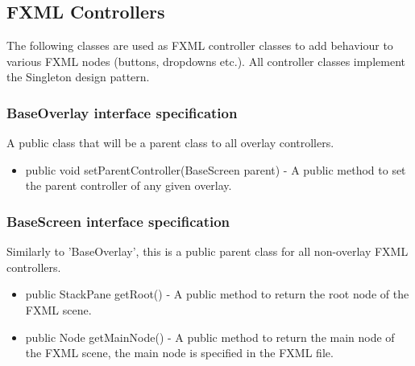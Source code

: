     \subsection{FXML Controllers}
   		The following classes are used as FXML controller classes to add behaviour to various FXML nodes (buttons, dropdowns etc.). All controller classes implement the Singleton design pattern.
        \subsubsection{BaseOverlay interface specification}
        	A public class that will be a parent class to all overlay controllers.
            \begin{itemize}
            	\item public void setParentController(BaseScreen parent) - A public method to set the parent controller of any given overlay.
            \end{itemize}
                
        \subsubsection{BaseScreen interface specification}
        	Similarly to 'BaseOverlay', this is a public parent class for all non-overlay FXML controllers.
            \begin{itemize}
            	\item public StackPane getRoot() - A public method to return the root node of the FXML scene.
                \item public Node getMainNode() - A public method to return the main node of the FXML scene, the main node is specified in the FXML file.
            \end{itemize}

